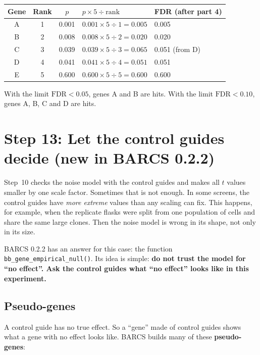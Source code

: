 \begin{worked}
\begin{tabular}{@{}cccll@{}}
\toprule
Gene & Rank & $p$ & $p \times 5 \div \text{rank}$ & FDR (after part 4)\\
\midrule
A & 1 & 0.001 & $0.001 \times 5 \div 1 = 0.005$ & 0.005\\
B & 2 & 0.008 & $0.008 \times 5 \div 2 = 0.020$ & 0.020\\
C & 3 & 0.039 & $0.039 \times 5 \div 3 = 0.065$ & 0.051 (from D)\\
D & 4 & 0.041 & $0.041 \times 5 \div 4 = 0.051$ & 0.051\\
E & 5 & 0.600 & $0.600 \times 5 \div 5 = 0.600$ & 0.600\\
\bottomrule
\end{tabular}

\smallskip
With the limit $\text{FDR} < 0.05$, genes A and B are hits. With the limit
$\text{FDR} < 0.10$, genes A, B, C and D are hits.
\end{worked}

\section{Step 13: Let the control guides decide (new in BARCS 0.2.2)}

Step~10 checks the noise model with the control guides and makes all $t$
values smaller by one scale factor. Sometimes that is not enough. In some
screens, the control guides have \emph{more extreme} values than any
scaling can fix. This happens, for example, when the replicate flasks were
split from one population of cells and share the same large clones. Then
the noise model is wrong in its shape, not only in its size.

BARCS 0.2.2 has an answer for this case: the function
\texttt{bb\_gene\_empirical\_null()}. Its idea is simple: \textbf{do not
trust the model for ``no effect''. Ask the control guides what ``no
effect'' looks like in this experiment.}

\subsection{Pseudo-genes}

A control guide has no true effect. So a ``gene'' made of control guides
shows what a gene with no effect looks like. BARCS builds many of these
\textbf{pseudo-genes}:

